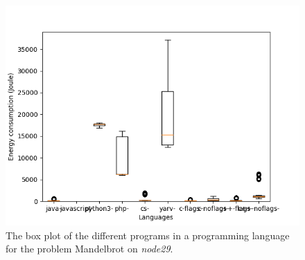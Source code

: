 \begin{appendices}
\begin{table}[h]
\centering
{}
\caption{The comparison of the different languages for the Fasta problem on \textit{node29}. A \textit{+} means that the language on the row has a lower energy consumption then the language on the column, the opposite for \textit{-}, and the \textit{Unknown} means that we could not reject the null hypothesis.}
\label{tab:lang-fasta2}
\end{table}

\begin{figure}[h]
    \centering
    \includegraphics[width=.6\textwidth]{graphs/mandelbrot_BOXoverview2.png}
    \caption{The box plot of the different programs in a programming language for the problem Mandelbrot on \textit{node29}.}
    \label{fig:box-mandelbrot2}
\end{figure}


\end{appendices}
